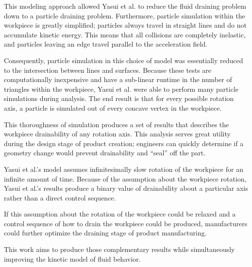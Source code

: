This modeling approach allowed Yasui et al. to reduce the fluid draining problem down to a particle draining problem. Furthermore, particle simulation within the workpiece is greatly simplified; particles always travel in straight lines and do not accumulate kinetic energy. This means that all collisions are completely inelastic, and particles leaving an edge travel parallel to the acceleration field.

Consequently, particle simulation in this choice of model was essentially reduced to the intersection between lines and surfaces. Because these tests are computationally inexpensive and have a sub-linear runtime in the number of triangles within the workpiece, Yasui et al. were able to perform many particle simulations during analysis. The end result is that for every possible rotation axis, a particle is simulated out of every concave vertex in the workpiece.

This thoroughness of simulation produces a set of results that describes the workpiece drainability of any rotation axis. This analysis serves great utility during the design stage of product creation; engineers can quickly determine if a geometry change would prevent drainability and ``seal'' off the part.

Yasui et al.'s model assumes infinitesimally slow rotation of the workpiece for an infinite amount of time. Because of the assumption about the workpiece rotation, Yasui et al.'s results produce a binary value of drainability about a particular axis rather than a direct control sequence.

If this assumption about the rotation of the workpiece could be relaxed and a  control sequence of how to drain the workpiece could be produced, manufacturers could further optimize the draining stage of product manufacturing.

This work aims to produce those complementary results while simultaneously improving the kinetic model of fluid behavior.




